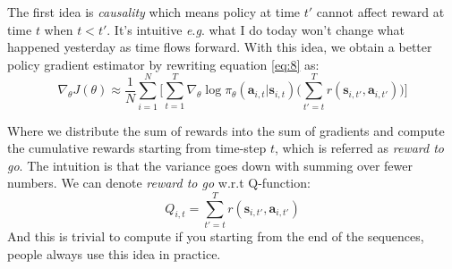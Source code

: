\documentclass{tufte-handout}
\newcommand{\eg}{\textit{e}.\textit{g}. }
\newcommand{\s}{\mathbf{s}}
\newcommand{\act}{\mathbf{a}}
\begin{document}
The first idea is \emph{causality} which means policy at time $t'$ cannot affect reward at time $t$ when $t < t'$. It's intuitive \eg what I do today won't change what happened yesterday as time flows forward. With this idea, we obtain a better policy gradient estimator by rewriting equation \ref{eq:8} as:
\begin{equation}
\label{eq:18}
\nabla _\theta J(\theta) \approx \frac{1}{N} \sum_{i=1} ^ {N} \bigg[\sum_{t=1}^T \nabla_\theta \log \pi_\theta(\act_{i,t}| \s_{i,t})
  \Big( \sum_{t'=t}^T r(\s_{i, t'}, \act_{i, t'}) \Big) \bigg]
\end{equation}

Where we distribute the sum of rewards into the sum of gradients and compute the cumulative rewards starting from time-step $t$, which is referred as \emph{reward to go}. The intuition is that the variance goes down with summing over fewer numbers. We can denote \emph{reward to go} w.r.t Q-function:
\begin{equation}
\label{eq:19}
Q_{i,t} = \sum_{t' = t} ^T r(\s_{i, t'}, \act_{i, t'})
\end{equation}
And this is trivial to compute if you starting from the end of the sequences, people always use this idea in practice.
\end{document}

